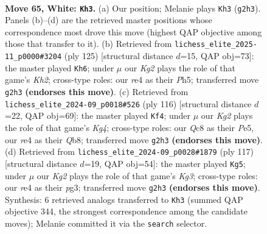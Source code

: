 \documentclass[11pt]{article}
\begin{document}
\clearpage

\begin{figure}[p]\centering
\begin{subfigure}{0.46\textwidth}\centering
\resizebox{\linewidth}{!}{%
\newchessgame
\chessboard[
  setfen={2Q5/8/5pk1/3p4/4r3/6P1/3q2KP/8 w - - 10 65},
  showmover=false,
  pgfstyle=straightmove, color=movearrow, markmove={g2-h3}
]}
\caption{}
\end{subfigure}\hfill
\begin{subfigure}{0.46\textwidth}\centering
\resizebox{\linewidth}{!}{%
\newchessgame
\chessboard[
  setfen={8/4Q2k/KP4p1/7p/5P1P/8/8/3q4 b - - 4 63},
  showmover=false,
  pgfstyle=straightmove, color=movearrow, markmove={h7-h6}
]}
\caption{}
\end{subfigure}
\\[4pt]
\begin{subfigure}{0.46\textwidth}\centering
\resizebox{\linewidth}{!}{%
\newchessgame
\chessboard[
  setfen={1Q6/5k2/4p3/4P2P/6K1/6P1/8/3q4 w - - 10 59},
  showmover=false,
  pgfstyle=straightmove, color=movearrow, markmove={g4-f4}
]}
\caption{}
\end{subfigure}\hfill
\begin{subfigure}{0.46\textwidth}\centering
\resizebox{\linewidth}{!}{%
\newchessgame
\chessboard[
  setfen={4Q3/8/2P2pk1/q4p2/2K5/6P1/8/8 b - - 2 59},
  showmover=false,
  pgfstyle=straightmove, color=movearrow, markmove={g6-g5}
]}
\caption{}
\end{subfigure}
\caption{\textbf{Move 65, White: \texttt{Kh3}.} (a) Our position; Melanie plays \texttt{Kh3} (\texttt{g2h3}). Panels (b)--(d) are the retrieved master positions whose correspondence most drove this move (highest QAP objective among those that transfer to it). (b) Retrieved from \texttt{lichess\_elite\_2025-11\_p0000\#3204} (ply 125) [structural distance $d$=15, QAP obj=73]: the master played \texttt{Kh6}; under $\mu$ our \emph{Kg2} plays the role of that game's \emph{Kh2}; cross-type roles: our \emph{r}e4 as their \emph{P}h5; transferred move \texttt{g2h3} \textbf{(endorses this move)}. (c) Retrieved from \texttt{lichess\_elite\_2024-09\_p0018\#526} (ply 116) [structural distance $d$=22, QAP obj=69]: the master played \texttt{Kf4}; under $\mu$ our \emph{Kg2} plays the role of that game's \emph{Kg4}; cross-type roles: our \emph{Q}c8 as their \emph{P}e5, our \emph{r}e4 as their \emph{Q}b8; transferred move \texttt{g2h3} \textbf{(endorses this move)}. (d) Retrieved from \texttt{lichess\_elite\_2024-09\_p0028\#1879} (ply 117) [structural distance $d$=19, QAP obj=54]: the master played \texttt{Kg5}; under $\mu$ our \emph{Kg2} plays the role of that game's \emph{Kg3}; cross-type roles: our \emph{r}e4 as their \emph{p}g3; transferred move \texttt{g2h3} \textbf{(endorses this move)}. Synthesis: 6 retrieved analogs transferred to \texttt{Kh3} (summed QAP objective 344, the strongest correspondence among the candidate moves); Melanie committed it via the \texttt{search} selector.}
\label{fig:thought-m128}
\end{figure}
\end{document}
